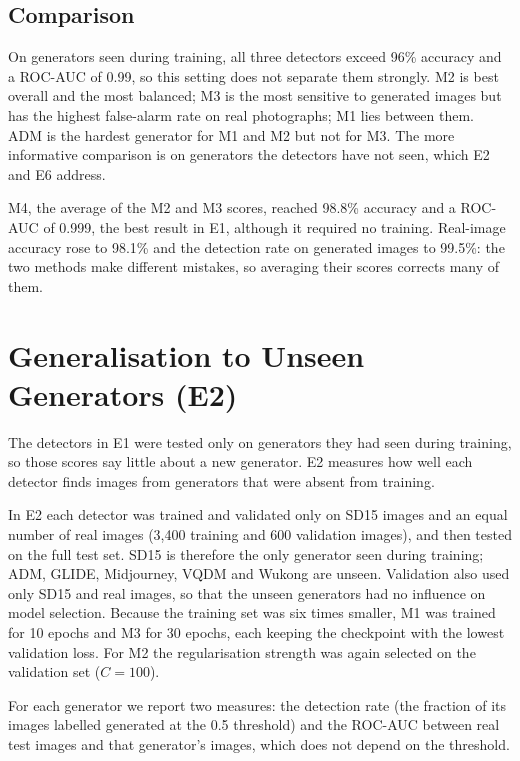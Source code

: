 \documentclass{mnnit}
\begin{document}
\subsection*{Comparison}
On generators seen during training, all three detectors exceed 96\%
accuracy and a \mbox{ROC-AUC} of 0.99, so this setting does not separate them
strongly. M2 is best overall and the most balanced; M3 is the most
sensitive to generated images but has the highest false-alarm rate on
real photographs; M1 lies between them. ADM is the hardest generator for
M1 and M2 but not for M3. The more informative comparison is on
generators the detectors have not seen, which E2 and E6 address.

M4, the average of the M2 and M3 scores, reached 98.8\% accuracy and a
\mbox{ROC-AUC} of 0.999, the best result in E1, although it required no
training. Real-image accuracy rose to 98.1\% and the detection rate on
generated images to 99.5\%: the two methods make different mistakes,
so averaging their scores corrects many of them.

\section{Generalisation to Unseen Generators (E2)}
The detectors in E1 were tested only on generators they had seen during
training, so those scores say little about a new generator. E2 measures
how well each detector finds images from generators that were absent
from training.

In E2 each detector was trained and validated only on SD15 images and an
equal number of real images (3{,}400 training and 600 validation
images), and then tested on the full test set. SD15 is therefore the only
generator seen during training; ADM, GLIDE, Midjourney, VQDM and Wukong
are unseen. Validation also used only SD15 and real images, so that the
unseen generators had no influence on model selection. Because the
training set was six times smaller, M1 was trained for 10 epochs and M3
for 30 epochs, each keeping the checkpoint with the lowest validation
loss. For M2 the regularisation strength was again selected on the
validation set ($C = 100$).

For each generator we report two measures: the detection rate (the
fraction of its images labelled generated at the 0.5 threshold) and the
\mbox{ROC-AUC} between real test images and that generator's images, which does
not depend on the threshold.
\end{document}
